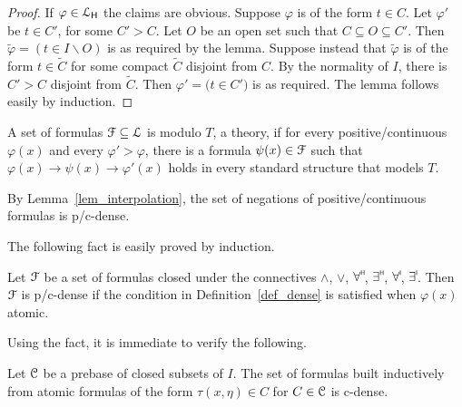 \documentclass{amsproc}
\renewcommand*{\emph}[1]{%
   \smash{\tikz[baseline]\node[rectangle, fill=teal!25, rounded corners, inner xsep=0.5ex, inner ysep=0.2ex, anchor=base, minimum height = 2.7ex]{\strut #1};}}
\begin{document}
\begin{proof}
  If $\varphi\in {\EuScript L}_{\sf H}$ the claims are obvious.
  Suppose $\varphi$ is of the form $t\in C$.
  Let $\varphi'$ be $t\in C'$, for some $C'>C$.
  Let $O$ be an open set such that $C\subseteq O\subseteq C'$.
  Then $\tilde\varphi=(t\in I\smallsetminus O)$ is as required by the lemma.
  Suppose instead that $\tilde\varphi$ is of the form $t\in\tilde{C}$ for some compact $\tilde{C}$ disjoint from $C$.
  By the normality of $I$, there is  $C'>C$ disjoint from $\tilde{C}$.
  Then  $\varphi'=\big(t\in C'\big)$ is as required.
  The lemma follows easily by induction.
\end{proof}

\begin{definition}\label{def_dense}
  A set of formulas ${\EuScript F}\subseteq{\EuScript L}$ is \emph{p/c-dense\/} modulo $T$, a theory, if for every positive/continuous $\varphi(x)$ and every $\varphi'>\varphi$, there is a formula $\psi(x)\in{\EuScript F}$ such that $\varphi(x)\rightarrow\psi(x)\rightarrow\varphi'(x)$ holds in every standard structure that models $T$.
\end{definition}

\begin{example}
  By Lemma~\ref{lem_interpolation}, the set of negations of positive/continuous formulas is p/c-dense.
\end{example}

The following fact is easily proved by induction.

\begin{fact}
  Let ${\EuScript F}$ be a set of formulas closed under the connectives $\wedge$, $\vee$, $\forall\raisebox{1.1ex}{\scaleto{\sf H}{.8ex}\kern-.2ex}$, $\exists\raisebox{1.1ex}{\scaleto{\sf H}{.8ex}\kern-.2ex}$, $\forall\raisebox{1.1ex}{\scaleto{\sf I}{.8ex}\kern-.2ex}$, $\exists\raisebox{1.1ex}{\scaleto{\sf I}{.8ex}\kern-.2ex}$.
  Then ${\EuScript F}$ is p/c-dense if the condition in Definition~\ref{def_dense} is satisfied when $\varphi(x)$ atomic.
\end{fact}

Using the fact, it is immediate to verify the following.

\begin{example}\label{ex_prebase}
  Let ${\EuScript C}$ be a prebase of closed subsets of $I$.
  The set of formulas built inductively from atomic formulas of the form $\tau(x,\eta)\in C$ for $C\in{\EuScript C}$ is c-dense.
\end{example}
\end{document}
